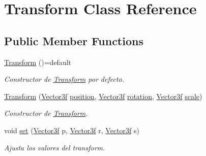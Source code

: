 \hypertarget{class_transform}{}\section{Transform Class Reference}
\label{class_transform}
\subsection*{Public Member Functions}
\begin{DoxyCompactItemize}
\item 
\mbox{\hyperlink{class_transform_a144ce8dcafd13ca66acb5a1636cfc297}{Transform}} ()=default
\begin{DoxyCompactList}\small\item\em Constructor de \mbox{\hyperlink{class_transform}{Transform}} por defecto. \end{DoxyCompactList}\item 
\mbox{\hyperlink{class_transform_a7a1c55445b749731080b1b035b35601f}{Transform}} (\mbox{\hyperlink{structmathexp_1_1_vector3f}{Vector3f}} \mbox{\hyperlink{class_transform_a93e0de362a87f0b687f1cd90a2c144ba}{position}}, \mbox{\hyperlink{structmathexp_1_1_vector3f}{Vector3f}} \mbox{\hyperlink{class_transform_ad8ef4617a93b1e5959cda74122ded7e5}{rotation}}, \mbox{\hyperlink{structmathexp_1_1_vector3f}{Vector3f}} \mbox{\hyperlink{class_transform_a3393425f0ba702b4a31d978f2118fe37}{scale}})
\begin{DoxyCompactList}\small\item\em Constructor de \mbox{\hyperlink{class_transform}{Transform}}. \end{DoxyCompactList}\item 
void \mbox{\hyperlink{class_transform_aac3e9c3d428165e79099e5ec37a05300}{set}} (\mbox{\hyperlink{structmathexp_1_1_vector3f}{Vector3f}} p, \mbox{\hyperlink{structmathexp_1_1_vector3f}{Vector3f}} r, \mbox{\hyperlink{structmathexp_1_1_vector3f}{Vector3f}} s)
\begin{DoxyCompactList}\small\item\em Ajusta los valores del transform. \end{DoxyCompactList}\end{DoxyCompactItemize}

